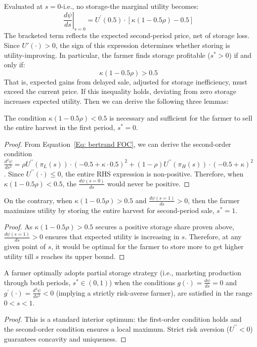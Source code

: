 Evaluated at $s = 0$-i.e., no storage-the marginal utility becomes:
$$
\left.\frac{d\psi}{ds}\right|_{s=0} = U^{\prime}(0.5) \cdot \left[\kappa(1 - 0.5\rho ) - 0.5\right]
$$
The bracketed term reflects the expected second-period price, net of storage loss. Since $U'(\cdot) > 0$, the sign of this expression determines whether storing is utility-improving. In particular, the farmer finds storage profitable ($s^* > 0$) if and only if:
$$
\kappa(1 - 0.5\rho) > 0.5
$$
That is, expected gains from delayed sale, adjusted for storage inefficiency, must exceed the current price. If this inequality holds, deviating from zero storage increases expected utility. Then we can derive the following three lemmas:
\begin{lemma}
    The condition $\kappa (1 - 0.5\rho) < 0.5$ is necessary and sufficient for the farmer to sell the entire harvest in the first period, $s^*=0$.
        \label{lemma: Bertrand no storage solution}
\end{lemma}
\begin{proof}
    From Equation~\ref{Eq: bertrand FOC}, we can derive the second-order condition $\frac{d^2 \psi}{d s^2} = \rho U^{\prime \prime}\left(\pi_L(s)\right) \cdot\left(-0.5+ \kappa \cdot 0.5\right)^2+(1-\rho) U^{\prime \prime}\left(\pi_H(s)\right) \cdot\left(-0.5+\kappa\right)^2$. Since $U^{\prime\prime}(\cdot)\leq0$, the entire RHS expression is non-positive. Therefore, when $\kappa (1-0.5\rho) < 0.5 $, the $\frac{d \psi(s=0)}{d s}$ would never be positive.
\end{proof}


\begin{lemma}
    On the contrary, when $\kappa (1-0.5\rho) > 0.5 $ and $\frac{d \psi(s=1)}{d s}>0$, then the farmer maximizes utility by storing the entire harvest for second-period sale, $s^*=1$.
    \label{lemma: Bertrand full storage solution}
\end{lemma}
\begin{proof}
    As $\kappa (1-0.5\rho) > 0.5 $ secures a positive storage share proven above, $\frac{d \psi(s=1)}{d s}>0$ ensures that expected utility is increasing in $s$. Therefore, at any given point of $s$, it would be optimal for the farmer to store more to get higher utility till $s$ reaches its upper bound.
\end{proof}


\begin{lemma}
    A farmer optimally adopts partial storage strategy (i.e., marketing production through both periods, $s^*\in (0,1)$) when the conditions $g(\cdot)  =  \frac{d \psi}{d s} = 0$ and $g^\prime(\cdot) = \frac{d^2 \psi}{d s^2} < 0 $ (implying a strictly risk-averse farmer), are satisfied in the range $0<s<1$.
    \label{lemma: Bertrand Interior solution}
\end{lemma}
\begin{proof}
    This is a standard interior optimum: the first-order condition holds and the second-order condition ensures a local maximum. Strict risk aversion ($U^{\prime\prime} < 0$) guarantees concavity and uniqueness.
\end{proof}

